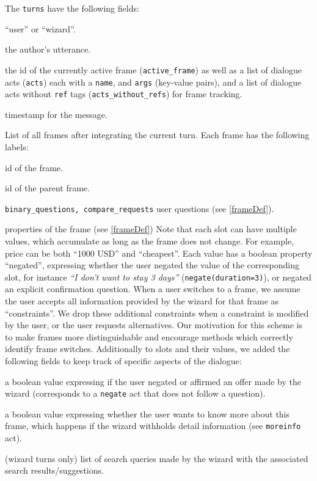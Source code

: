 \documentclass{article}
\theoremstyle{definition}
\begin{document}
The \texttt{turns} have the following fields:
\begin{description}[noitemsep,font=$\bullet$ \ttfamily\mdseries,itemindent=-1.5mm]
\item [author] ``user'' or ``wizard''.
\item [text] the author's utterance.
\item [labels] the id of the currently active frame (\texttt{active\_frame}) as well as a list of dialogue acts (\texttt{acts}) each with a \texttt{name}, and \texttt{args} (key-value pairs), and a list of dialogue acts without \texttt{ref} tags (\texttt{acts\_without\_refs}) for frame tracking.
\item [timestamp] timestamp for the message.
\item [frames] List of all frames after integrating the current turn. Each frame has the following labels:
\begin{description}[noitemsep,font=$\bullet$ \ttfamily\mdseries,itemindent=-1.5mm]
\item [frame\_id] id of the frame.
\item [frame\_parent\_id] id of the parent frame.
\item [requests,] \texttt{binary\_questions, compare\_requests} user questions (see \cref{frameDef}). 
\item [info] properties of the frame (see \cref{frameDef}) Note that each slot can have multiple values, which accumulate as long as the frame does not change. For example, price can be both ``1000 USD'' and ``cheapest''.
  Each value has a boolean property ``negated'', expressing whether the user negated the value of the corresponding slot, for instance \textit{``I don't want to stay 3 days''} (\texttt{negate(duration=3)}), or negated an explicit confirmation question.
  When a user switches to a frame, we assume the user accepts all information provided by the wizard for that frame as ``constraints''. We drop these additional constraints when a constraint is modified by the user, or the user requests alternatives. Our motivation for this scheme is to make frames more distinguishable and encourage methods which correctly identify frame switches.
  Additionally to slots and their values, we added the following fields to keep track of specific aspects of the dialogue: 
\begin{description}[font=$\bullet$ \ttfamily\mdseries,style=unboxed]
  \item [REJECTED] a boolean value expressing if the user negated or affirmed an offer made by the wizard (corresponds to a \texttt{negate} act that does not follow a question).
  \item [MOREINFO] a boolean value expressing whether the user wants to know more about this frame, which happens if the wizard withholds detail information (see \texttt{moreinfo} act).
\end{description}
\end{description}
\item [db] (wizard turns only) list of search queries made by the wizard with the associated search results/suggestions.
\end{description}
\end{document}
